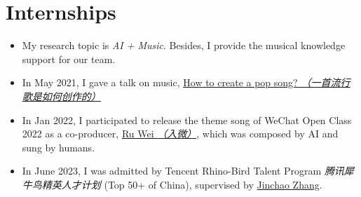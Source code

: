 \documentclass{resume}
\begin{document}
\section{Internships}
{\small {}
}
\begin{itemize}
  \item My research topic is \textit{AI + Music}. Besides, I provide the musical knowledge support for our
        team.
  \item In May 2021, I gave a talk on music,
        \href{https://www.zhangxueyao.com/data/wcpr-pop-music.pdf}{\underline{How to
            create a pop song? \textit{（一首流行歌是如何创作的）}}}
  \item In Jan 2022, I participated to release the theme song of WeChat Open Class 2022
        as a co-producer, \href{https://y.qq.com/n/ryqq/songDetail/000xeNJ53orPG2}{Ru
          Wei \textit{（入微）}}, which was composed by AI and sung by humans.
  \item In June 2023, I was admitted by Tencent Rhino-Bird Talent Program \textit{腾讯犀牛鸟精英人才计划}
        (Top 50+ of China), supervised by
        \href{https://scholar.google.com/citations?user=vH9YLsAAAAAJ&hl=en}{Jinchao
          Zhang}.
\end{itemize}
\end{document}
